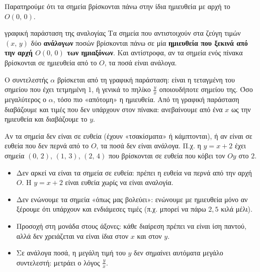 \begin{center}
\end{center}

Παρατηρούμε ότι τα σημεία βρίσκονται πάνω στην ίδια ημιευθεία με αρχή το $O(0,\,0)$.

\begin{idiotita}{γραφική παράσταση της αναλογίας}
Τα σημεία που αντιστοιχούν στα ζεύγη τιμών $(x,\,y)$ δύο \textbf{ανάλογων} ποσών βρίσκονται πάνω σε μία \textbf{ημιευθεία που ξεκινά από την αρχή $O(0,\,0)$ των ημιαξόνων}. Και αντίστροφα, αν τα σημεία ενός πίνακα βρίσκονται σε ημιευθεία από το $O$, τα ποσά είναι ανάλογα.
\end{idiotita}

Ο συντελεστής $\alpha$ βρίσκεται από τη γραφική παράσταση: είναι η τεταγμένη του σημείου που έχει τετμημένη $1$, ή γενικά το πηλίκο $\frac{y}{x}$ οποιουδήποτε σημείου της. Όσο μεγαλύτερος ο $\alpha$, τόσο πιο «απότομη» η ημιευθεία. Από τη γραφική παράσταση διαβάζουμε και τιμές που δεν υπάρχουν στον πίνακα: ανεβαίνουμε από ένα $x$ ως την ημιευθεία και διαβάζουμε το $y$.


Αν τα σημεία δεν είναι σε ευθεία (έχουν «τσακίσματα» ή κάμπτονται), ή αν είναι σε ευθεία που δεν περνά από το $O$, τα ποσά δεν είναι ανάλογα. Π.χ. η $y=x+2$ έχει σημεία $(0,\,2)$, $(1,\,3)$, $(2,\,4)$ που βρίσκονται σε ευθεία που κόβει τον $Oy$ στο $2$.

\begin{prosoxi}
\begin{itemize}[leftmargin=1.2em,itemsep=0.3ex,topsep=2pt]
\item Δεν αρκεί να είναι τα σημεία σε ευθεία: πρέπει η ευθεία να περνά από την αρχή $O$. Η $y=x+2$ είναι ευθεία χωρίς να είναι αναλογία.
\item Δεν ενώνουμε τα σημεία «όπως μας βολεύει»: ενώνουμε με ημιευθεία μόνο αν ξέρουμε ότι υπάρχουν και ενδιάμεσες τιμές (π.χ. μπορεί να πάρω $2{,}5$ κιλά μέλι).
\item Προσοχή στη μονάδα στους άξονες: κάθε διαίρεση πρέπει να είναι ίση παντού, αλλά δεν χρειάζεται να είναι ίδια στον $x$ και στον $y$.
\item Σε ανάλογα ποσά, η μεγάλη τιμή του $y$ δεν σημαίνει αυτόματα μεγάλο συντελεστή: μετράει ο λόγος $\frac{y}{x}$.
\end{itemize}
\end{prosoxi}

